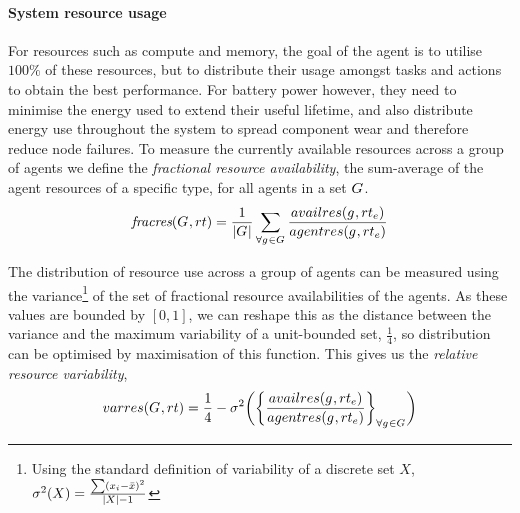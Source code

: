 \paragraph{System resource usage}
\newcommand{\functionResourceAvailableSymbol}[2]{
	\functionSymbol{\textit{fracres}}}
\newcommand{\functionResourceAvailable}[2]{
	\functionSignature{\functionResourceAvailableSymbol{}{}}
	{\setAgents{#1}{}, \varResourceType{#2}{}}
}
\newcommand{\functionResourceVariabilitySymbol}[2]{\functionSymbol{varres}{#1}{#2}}
\newcommand{\functionResourceVariability}[2]{
	\functionSignature{\functionResourceVariabilitySymbol{}{}}
	{\setAgents{#1}{}, \varResourceType{#2}{}}
}

\newcommand{\functionTaskPathEnergyVariability}[2]{
	\functionSignature{\functionResourceVariabilitySymbol{}{}}
	{\functionTaskArc{}{}, \varResourceTypeEnergy{}{}}
}
For resources such as compute and memory, the goal of the agent is to utilise $100\%$ of these resources, but to distribute their usage amongst tasks and actions to obtain the best performance. For battery power however, they need to minimise the energy used to extend their useful lifetime, and also distribute energy use throughout the system to spread component wear and therefore reduce node failures. To measure the currently available resources across a group of agents we define the \textit{fractional resource availability}, the sum-average of the agent resources of a specific type, for all agents in a set $G_{}^{}$.
\begin{equation}
	\functionResourceAvailable{}{} 
	= \frac{1}{\funcSize{\setAgents{}{}}}
		\sum_{\forall \varAgent{}{} \in \setAgents{}{}} 
		\frac
		{\functionAgentAvailableResources{}{e}}
		{\functionAgentResources{}{e}}
\end{equation}

The distribution of resource use across a group of agents can be measured using the variance\footnote{Using the standard definition of variability of a discrete set $X$, $\sigma^2(X) = \frac{\sum (x_i - \bar{x})^2}{\lvert X \rvert-1}$} of the set of fractional resource availabilities of the agents. As these values are bounded by $[0, 1]$, we can reshape this as the distance between the variance and the maximum variability of a unit-bounded set, $\frac{1}{4}$, so distribution can be optimised by maximisation of this function. This gives us the \textit{relative resource variability},
\begin{equation}     	
	\functionResourceVariability{}{} 
	= \frac{1}{4} - \sigma^2 
	\bigg(
	\bigg\lbrace \frac
		{\functionAgentAvailableResources{}{e}}
		{\functionAgentResources{}{e}}
	\bigg\rbrace_{\forall \varAgent{}{} \in \setAgents{}{}}
	\bigg)
\end{equation}

